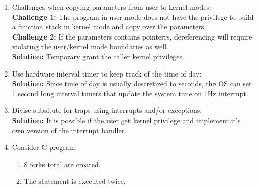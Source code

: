 \documentclass{article}
\begin{document}
\begin{enumerate} [label=\textbf{\arabic*}.]
		\paragraph{exec} If the header of the file for \texttt{exec} is not
		recognized, \texttt{exec} will result in error \texttt{ENOEXEC}.
		\paragraph{unlink} If the \texttt{pathname} points to somewhere outside of
		the alloted address sapce, \texttt{unlink} result in error \texttt{EFAULT}.

\item Challenges when copying parameters from user to kernel modes:\\
	\textbf{Challenge 1:} The program in user mode does not have the privilege to
	build a function stack in kernel mode and copy over the parameters.\\
	\textbf{Challenge 2:} If the parameters contains pointerrs, dereferencing will
	require violating the user/kernel mode boundaries as well.\\
	\textbf{Solution: } Temporary grant the caller kernel privileges.

	\item Use hardware interval timer to keep track of the time of day:\\
		\textbf{Solution:} Since time of day is usually descretized to seconds, the
		OS can set 1 second long interval timers that update the system time on
		1Hz interrupt.
	\item Divise subsitute for traps using interrupts and/or exceptions:\\
		\textbf{Solution:} It is possible if the user get kernel privilege and
		implement it's own version of the interrupt handler.
	\item Consider C program:
		\begin{enumerate} [label=\textbf{\alph*}.]
			\item 8 forks total are created.
			\item The statement is executed twice.
		\end{enumerate}
\end{enumerate}
\end{document}
